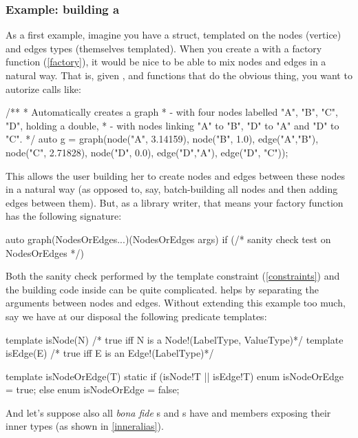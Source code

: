 \subsubsection{Example: building a }

As a first example, imagine you have a  struct, templated on the nodes (vertice) and edges types (themselves templated). When you create a  with a factory function (\ref{factory}), it would be nice to be able to mix nodes and edges in a natural way. That is, given ,  and  functions that do the obvious thing, you want to autorize calls like:

\begin{dcode}
/** 
* Automatically creates a graph 
*   - with four nodes labelled "A", "B", "C", "D", holding a double, 
*   - with nodes linking "A" to "B", "D" to "A" and "D" to "C".
*/
auto g = graph(node("A", 3.14159), node("B", 1.0), 
               edge("A","B"),
               node("C", 2.71828), node("D", 0.0), 
               edge("D","A"), edge("D", "C"));
\end{dcode}

This allows the user building her  to create nodes and edges between these nodes in a natural way (as opposed to, say, batch-building all nodes and then adding edges between them). But, as a library writer, that means your  factory function has the following signature:

\begin{dcode}
auto graph(NodesOrEdges...)(NodesOrEdges args) 
if (/* sanity check test on NodesOrEdges */)
\end{dcode}

Both the sanity check performed by the template constraint (\ref{constraints}) and the building code inside  can be quite complicated.  helps by separating the arguments between nodes and edges. Without extending this example too much, say we have at our disposal the following predicate templates:

\begin{dcode}
template isNode(N) {/* true iff N is a Node!(LabelType, ValueType)*/}
template isEdge(E) {/* true iff E is an Edge!(LabelType)*/}

template isNodeOrEdge(T)
{
    static if (isNode!T || isEdge!T)
        enum isNodeOrEdge = true;
    else
        enum isNodeOrEdge = false;
}
\end{dcode}

And let's suppose also all \emph{bona fide} s and s have   and  members exposing their inner types (as shown in \autoref{inneralias}).

